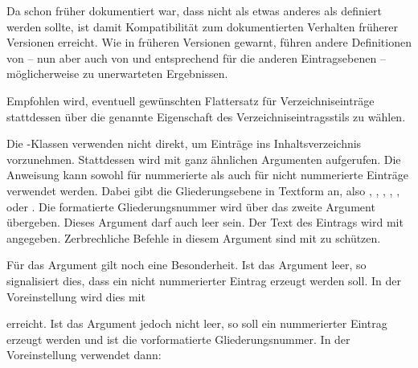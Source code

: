 Da schon früher dokumentiert war, dass  nicht
als etwas anderes als  definiert werden sollte, ist damit
Kompatibilität zum dokumentierten Verhalten früherer Versionen erreicht. Wie
in früheren Versionen gewarnt, führen andere Definitionen von
 -- nun aber auch von  und
entsprechend für die anderen Eintragsebenen -- möglicherweise zu unerwarteten
Ergebnissen.

Empfohlen wird, eventuell gewünschten Flattersatz für Verzeichniseinträge
stattdessen über die genannte Eigenschaft des Verzeichniseintragsstils
 zu wählen.%
\EndIndexGroup


\begin{Declaration}
\end{Declaration}
Die \KOMAScript-Klassen verwenden
%
 nicht direkt, um Einträge ins
Inhaltsverzeichnis vorzunehmen. Stattdessen wird 
mit ganz ähnlichen Argumenten aufgerufen. Die Anweisung kann sowohl für
nummerierte als auch für nicht nummerierte Einträge verwendet werden. Dabei
gibt  die Gliederungsebene in Textform an, also ,
, , ,
,  oder . Die
formatierte Gliederungsnummer wird über das zweite Argument 
übergeben. Dieses Argument darf auch leer sein. Der Text des Eintrags wird mit
 angegeben. Zerbrechliche Befehle in
diesem Argument sind mit
 zu schützen.

Für das Argument  gilt noch eine Besonderheit. Ist das Argument
leer, so signalisiert dies, dass ein nicht nummerierter Eintrag erzeugt werden
soll. In der Voreinstellung wird dies mit
\begin{quote}\small\raggedright
\end{quote}
erreicht. Ist das Argument jedoch nicht leer, so soll ein nummerierter Eintrag
erzeugt werden und  ist die vorformatierte Gliederungsnummer. In
der Voreinstellung verwendet \KOMAScript{} dann:
\begin{quote}\small\raggedright
\end{quote}
\iffalse zur Erzeugung dieses Eintrags.\fi

